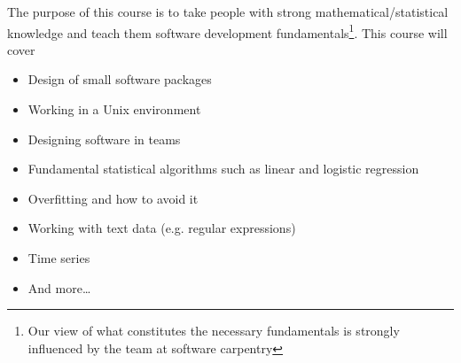 The purpose of this course is to take people with strong mathematical/statistical knowledge and teach them software development fundamentals\footnote{Our view of what constitutes the necessary fundamentals is strongly influenced by the team at software carpentry\cite{SWC}}.  This course will cover
\begin{itemize}
  \item Design of small software packages
  \item Working in a Unix environment
  \item Designing software in teams
  \item Fundamental statistical algorithms such as linear and logistic regression
  \item Overfitting and how to avoid it
  \item Working with text data (e.g. regular expressions)
  \item Time series
  \item And more\dots
\end{itemize}

